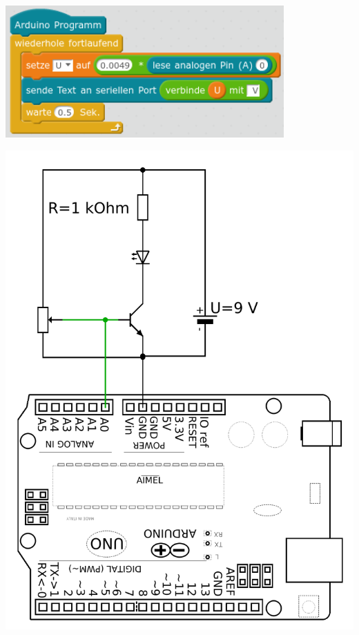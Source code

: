 \begin{aufgabe}
\begin{minipage}[c][8cm][t]{0.58\textwidth}
		\begin{center}
			\includegraphics[width=0.8\textwidth]{./pics/Programm-Spannung-messen.png}
		\end{center}
	\end{minipage}
	\hfill
	\begin{minipage}[c][8cm][t]{0.38\textwidth}
		\centering
		\includegraphics[width=\textwidth]{./Zeichnungen/Schaltplan-U-BE-Messung.png}
	\end{minipage}
\end{aufgabe}

